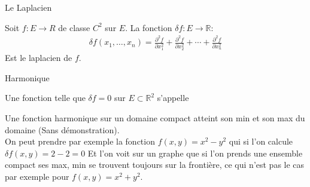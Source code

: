 \begin{parag}{Le Laplacien}
    \begin{definition}
        Soit $f: E \to R $ de classe $C^2$ sur $E$. La fonction $ \delta f: E \to \mathbb{R}$:
        \begin{align*}
            \delta f(x_1, \dots, x_n) = \frac{\partial^2 f}{\partial x_1^2} + \frac{\partial^2 f}{\partial x_2^2} + \cdots  + \frac{\partial^2 f}{\partial x_n^2}
        \end{align*}
        Est le laplacien de $f$.
    \end{definition}
\end{parag}
\begin{parag}{Harmonique}
    \begin{definition}
    Une fonction telle que $ \delta f = 0$ sur $E \subset \mathbb{R}^2$ s'appelle 
    \end{definition}
    
    Une fonction harmonique sur un domaine compact atteint son min et son max  du domaine (Sans démonstration).\\
    On peut prendre par exemple la fonction $f(x, y) = x^2 - y^2$ qui si l'on calcule $ \delta f(x, y) = 2 -2 = 0$ Et l'on voit sur un graphe que si l'on prends une ensemble compact ses max, min se trouvent toujours sur la frontière, ce qui n'est pas le cas par exemple pour $f(x, y) = x^2 + y^2$.
\end{parag}



